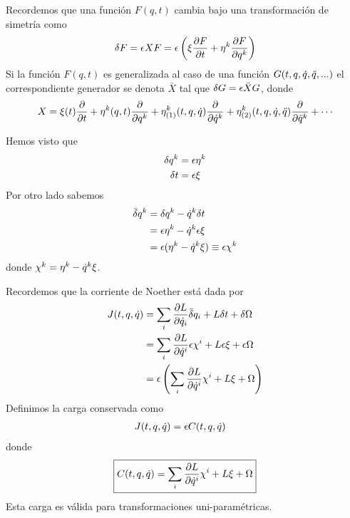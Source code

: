 Recordemos que una función $F(q,t)$ cambia bajo una transformación de simetría como
\begin{align}
  \delta F=\epsilon XF=\epsilon\left(\xi\pdv{F}{t}+\eta^k\pdv{F}{q^k}\right)
\end{align}
Si la función $F(q,t)$ es generalizada al caso de una función $G(t,q,\dot{q},\ddot{q},...) $ el correspondiente generador se denota $\bar{X}$ tal que $\delta G=\epsilon\bar{X}G$, donde 
\begin{align}
  X=\xi(t)\pdv{t}+\eta^k(q,t)\pdv{q^k}+\eta^k_{(1)}(t,q,\dot{q})\pdv{\dot{q}^k}+\eta^k_{(2)}(t,q,\dot{q},\ddot{q})\pdv{\ddot{q}^k}+\cdots 
\end{align}


Hemos visto que
\begin{align}
  \delta q^k&=\epsilon \eta^k\\
  \delta t&=\epsilon\xi
\end{align}
Por otro lado sabemos
\begin{align}
  \bar{\delta} q^k&=\delta q^k-\dot{q}^k\delta t\\
  &=\epsilon\eta^k-\dot{q}^k\epsilon\xi\\
  &=\epsilon(\eta^k-\dot{q}^k\xi)\equiv \epsilon \chi ^k
\end{align}
donde $\chi^k=\eta^k-\dot{q}^k\xi$.

Recordemos que la corriente de Noether está dada por
\begin{align}
  J(t,q,\dot{q})&=\sum_i\pdv{L}{\dot{q}_i}\bar{\delta} q_i+L\delta t+\delta\Omega\label{10.J}\\
  &=\sum_i\pdv{L}{\dot{q}^{i}}\epsilon\chi^{i}+L\epsilon\xi+\epsilon\Omega\\
  &=\epsilon\left(\sum_i\pdv{L}{\dot{q}^{i}}\chi^{i}+L\xi+\Omega\right)
\end{align}
Definimos la carga conservada como
\begin{align}
  J(t,q,\dot{q})&=\epsilon C(t,q,\dot{q})
\end{align}
donde
\begin{equation}
\boxed{  C(t,q,\dot{q})=\sum_i\pdv{L}{\dot{q}^{i}}\chi^{i}+L\xi+\Omega}
\end{equation}
Esta carga es válida para transformaciones uni-paramétricas.

